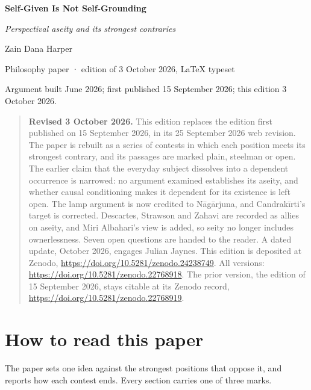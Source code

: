 \documentclass[11pt]{article}
\begin{document}
\begin{center}
{\LARGE\bfseries Self-Given Is Not Self-Grounding\par}
\medskip
{\large\emph{Perspectival aseity and its strongest contraries}\par}
\medskip
Zain Dana Harper\par
{\small Philosophy paper · edition of 3 October 2026, LaTeX typeset\par}
{\small Argument built June 2026; first published 15 September 2026; this edition 3 October 2026.\par}
\end{center}

\begin{quote}\small
\textbf{Revised 3 October 2026.} This edition replaces the edition first published on 15 September 2026, in its 25 September 2026 web revision. The paper is rebuilt as a series of contests in which each position meets its strongest contrary, and its passages are marked plain, steelman or open. The earlier claim that the everyday subject dissolves into a dependent occurrence is narrowed: no argument examined establishes its aseity, and whether causal conditioning makes it dependent for its existence is left open. The lamp argument is now credited to Nāgārjuna, and Candrakīrti's target is corrected. Descartes, Strawson and Zahavi are recorded as allies on aseity, and Miri Albahari's view is added, so seity no longer includes ownerlessness. Seven open questions are handed to the reader. A dated update, October 2026, engages Julian Jaynes. This edition is deposited at Zenodo, \url{https://doi.org/10.5281/zenodo.24238749}. All versions: \url{https://doi.org/10.5281/zenodo.22768918}. The prior version, the edition of 15 September 2026, stays citable at its Zenodo record, \url{https://doi.org/10.5281/zenodo.22768919}.
\end{quote}
\section*{How to read this paper}

The paper sets one idea against the strongest positions that oppose it, and reports how each contest ends. Every section carries one of three marks.
\end{document}
